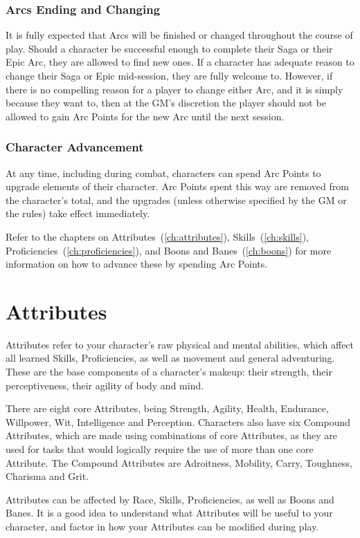 \documentclass[oneside,11pt,english]{book}
\begin{document}
 
\subsection{Arcs Ending and Changing}
It is fully expected that Arcs will be finished or changed throughout the course of play. Should a character 
be successful enough to complete their Saga or their Epic Arc, they are allowed to find new ones. If a 
character has adequate reason to change their Saga or Epic mid-session, they are fully welcome to. 
However, if there is no compelling reason for a player to change either Arc, and it is simply because they 
want to, then at the GM’s discretion the player should not be allowed to gain Arc Points for the new Arc 
until the next session. 


\subsection{Character Advancement}
At any time, including during combat, characters can spend Arc Points to upgrade elements of their 
character. Arc Points spent this way are removed from the character’s total, and the upgrades (unless 
otherwise specified by the GM or the rules) take effect immediately. 


Refer to the chapters on Attributes~(\autoref{ch:attributes}), Skills~(\autoref{ch:skills}), Proficiencies~(\autoref{ch:proficiencies}), and Boons and Banes~(\autoref{ch:boons}) for more information on how to advance these by spending Arc Points. 
\chapter{Attributes}\label{ch:attributes}
\clearpage
 

Attributes refer to your character’s raw physical and mental abilities, which affect all learned Skills, 
Proficiencies, as well as movement and general adventuring. These are the base components of a 
character’s makeup: their strength, their perceptiveness, their agility of body and mind. 


There are eight core Attributes, being Strength, Agility, Health, Endurance, Willpower, Wit, Intelligence 
and Perception. Characters also have six Compound Attributes, which are made using combinations of 
core Attributes, as they are used for tasks that would logically require the use of more than one core 
Attribute. The Compound Attributes are Adroitness, Mobility, Carry, Toughness, Charisma and Grit. 
 

Attributes can be affected by Race, Skills, Proficiencies, as well as Boons and Banes. It is a good idea to 
understand what Attributes will be useful to your character, and factor in how your Attributes can be 
modified during play. 
\end{document}
